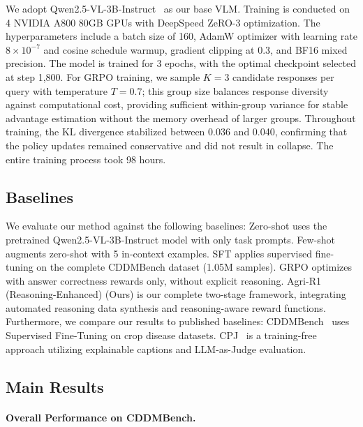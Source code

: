 \documentclass[sigconf,anonymous,review]{acmart}
\begin{document}
We adopt Qwen2.5-VL-3B-Instruct~\cite{bai2025qwen2} as our base VLM. Training is conducted on 4 NVIDIA A800 80GB GPUs with DeepSpeed ZeRO-3 optimization. The hyperparameters include a batch size of 160, AdamW optimizer with learning rate $8\times10^{-7}$ and cosine schedule warmup, gradient clipping at 0.3, and BF16 mixed precision. The model is trained for 3 epochs, with the optimal checkpoint selected at step 1,800. For GRPO training, we sample $K=3$ candidate responses per query with temperature $T=0.7$; this group size balances response diversity against computational cost, providing sufficient within-group variance for stable advantage estimation without the memory overhead of larger groups. Throughout training, the KL divergence stabilized between 0.036 and 0.040, confirming that the policy updates remained conservative and did not result in collapse. The entire training process took 98 hours.

\subsection{Baselines}

We evaluate our method against the following baselines: Zero-shot uses the pretrained Qwen2.5-VL-3B-Instruct model with only task prompts. Few-shot augments zero-shot with 5 in-context examples. SFT applies supervised fine-tuning on the complete CDDMBench dataset (1.05M samples). GRPO optimizes with answer correctness rewards only, without explicit reasoning. Agri-R1 (Reasoning-Enhanced) (Ours) is our complete two-stage framework, integrating automated reasoning data synthesis and reasoning-aware reward functions.
Furthermore, we compare our results to published baselines: CDDMBench~\cite{lu2024application} uses Supervised Fine-Tuning on crop disease datasets.
CPJ~\cite{zhang2025cpjexplainableagriculturalpest} is a training-free approach utilizing explainable captions and LLM-as-Judge evaluation.


\subsection{Main Results}
\label{sec:results}
\paragraph{\textbf{Overall Performance on CDDMBench.}}
\end{document}
